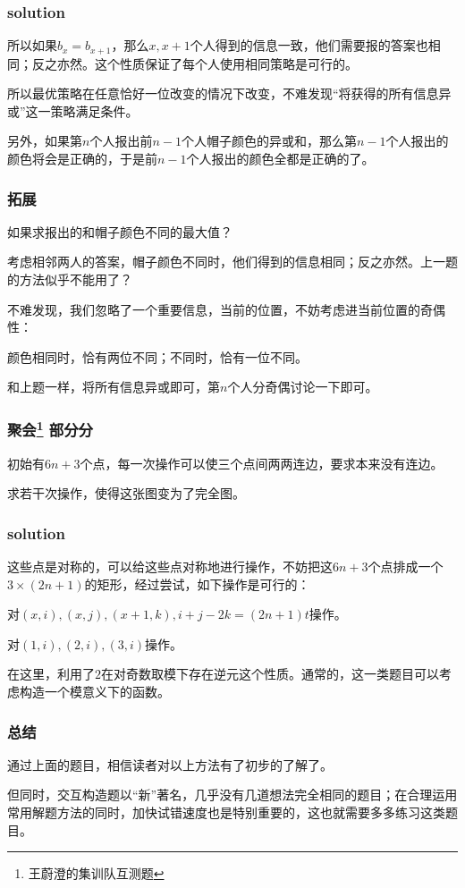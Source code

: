 \documentclass[10pt]{beamer}
\begin{document}
	\begin{frame}
		\frametitle{solution}	
		
		所以如果$b_{x}=b_{x+1}$，那么$x,x+1$个人得到的信息一致，他们需要报的答案也相同；反之亦然。这个性质保证了每个人使用相同策略是可行的。

		所以最优策略在任意恰好一位改变的情况下改变，不难发现“将获得的所有信息异或”这一策略满足条件。

		另外，如果第$n$个人报出前$n-1$个人帽子颜色的异或和，那么第$n-1$个人报出的颜色将会是正确的，于是前$n-1$个人报出的颜色全都是正确的了。
	
	\end{frame}
	\clearpage
	\begin{frame}
		\frametitle{拓展}
	
		如果求报出的和帽子颜色不同的最大值？

		考虑相邻两人的答案，帽子颜色不同时，他们得到的信息相同；反之亦然。上一题的方法似乎不能用了？


		不难发现，我们忽略了一个重要信息，当前的位置，不妨考虑进当前位置的奇偶性：
		
		颜色相同时，恰有两位不同；不同时，恰有一位不同。

		和上题一样，将所有信息异或即可，第$n$个人分奇偶讨论一下即可。
	
	\end{frame}
	\clearpage
	\begin{frame}
		\frametitle{聚会\footnote[1]{王蔚澄的集训队互测题} 部分分}
	
		初始有$6n+3$个点，每一次操作可以使三个点间两两连边，要求本来没有连边。

		求若干次操作，使得这张图变为了完全图。
	
	\end{frame}
	\clearpage
	\begin{frame}
		\frametitle{solution}
	
		这些点是对称的，可以给这些点对称地进行操作，不妨把这$6n+3$个点排成一个$3\times(2n+1)$的矩形，经过尝试，如下操作是可行的：

		对$(x,i),(x,j),(x+1,k),i+j-2k=(2n+1)t$操作。
		
		对$(1,i),(2,i),(3,i)$操作。

		在这里，利用了$2$在对奇数取模下存在逆元这个性质。通常的，这一类题目可以考虑构造一个模意义下的函数。
	
	\end{frame}
	\clearpage
	\begin{frame}
		\frametitle{总结}
	
		通过上面的题目，相信读者对以上方法有了初步的了解了。

		但同时，交互构造题以“新”著名，几乎没有几道想法完全相同的题目；在合理运用常用解题方法的同时，加快试错速度也是特别重要的，这也就需要多多练习这类题目。
	
	\end{frame}
\end{document}
